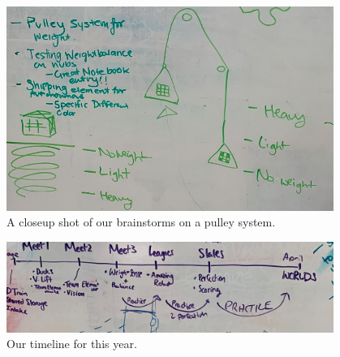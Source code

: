 \begin{figure}[htp]
\centering
  \includegraphics[width=0.95\textwidth]{Meetings/September/09-21-21/9-18-21_Team_Image7 - Nathan Forrer.jpg}
  \caption{A closeup shot of our brainstorms on a pulley system.}
  \label{fig:092122_7}
\end{figure}

\begin{figure}[htp]
\centering
  \centering
  \includegraphics[width=0.95\textwidth]{Meetings/September/09-21-21/9-18-21_Team_Image8 - Nathan Forrer.jpg}
  \caption{Our timeline for this year.}
  \label{fig:092122_8}
\end{figure}

